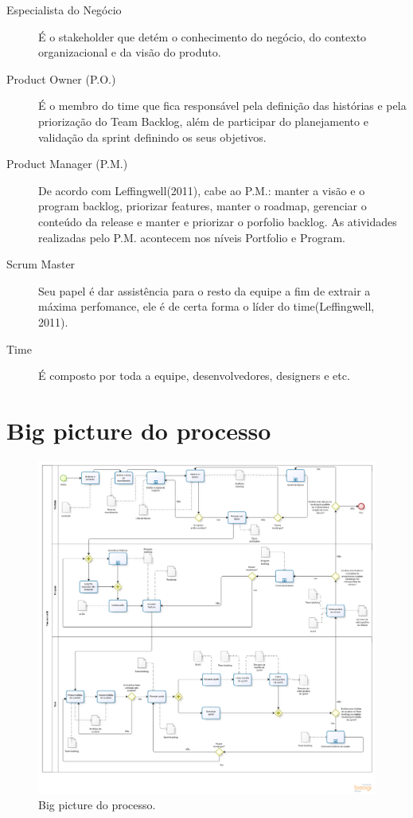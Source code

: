 \begin{description}
\item[Especialista do Negócio] É o stakeholder que detém o conhecimento do negócio, do contexto organizacional e da visão do produto.    
\item[Product Owner (P.O.)] É o membro do time que fica responsável pela definição das histórias e pela priorização do Team Backlog, além de participar do planejamento e validação da sprint definindo os seus objetivos.
\item[Product Manager (P.M.)] De acordo com Leffingwell(2011), cabe ao P.M.: manter a visão e o program backlog, priorizar features, manter o roadmap, gerenciar o conteúdo da release e manter e priorizar o porfolio backlog. As atividades realizadas pelo P.M. acontecem nos níveis Portfolio e Program.
\item[Scrum Master] Seu papel é dar assistência para o resto da equipe a fim de extrair a máxima perfomance, ele é de certa forma o líder do time(Leffingwell, 2011).
\item[Time] É composto por toda a equipe, desenvolvedores, designers e etc.
\end{description}

\section{Big picture do processo}
  \begin{figure}[!htbp]
    \centering
    \includegraphics[scale=0.3]{figuras/Processo_v1-2}
    \caption[Big picture do processo.]{Big picture do processo. \footnotemark}
    \label{processo}
  \end{figure}

